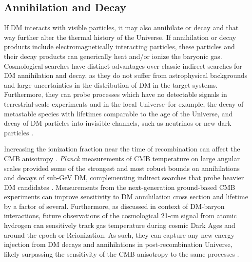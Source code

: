 \documentclass[12pt]{article}
\begin{document}
\subsection{Annihilation and Decay}

If DM interacts with visible particles, it may also annihilate or decay and that way further alter the thermal history of the Universe. 
If annihilation or decay products include electromagnetically interacting particles, these particles and their decay products can generically heat and/or ionize the baryonic gas.
Cosmological searches have distinct advantages over classic indirect searches for DM annihilation and decay, as they do not suffer from astrophysical backgrounds and large uncertainties in the distribution of DM in the target systems.
Furthermore, they can probe processes which have no detectable signals in terrestrial-scale experiments and in the local Universe--for example, the decay of metastable species with lifetimes comparable to the age of the Universe, and decay of DM particles into invisible channels, such as neutrinos or new dark particles \cite{Poulin:2016nat,Poulin:2016anj}. 

Increasing the ionization fraction near the time of recombination can affect the CMB anisotropy \cite{Adams:1998nr,Chen:2003gz, Padmanabhan:2005es,Dvorkin:2013cga}. 
\textit{Planck} measurements of CMB temperature on large angular scales provided some of the strongest and most robust bounds on annihilations and decays of sub-GeV DM, complementing indirect searches that probe heavier DM candidates \cite{Aghanim:2018eyx,Slatyer:2016qyl}. 
Measurements from the next-generation ground-based CMB experiments can improve sensitivity to DM annihilation cross section and lifetime by a factor of several.
Furthermore, as discussed in context of DM-baryon interactions, future observations of the cosmological 21-cm signal from atomic hydrogen can sensitively track gas temperature during cosmic Dark Ages and around the epoch or Reionization.
As such, they can capture any new energy injection from DM decays and annihilations in post-recombination Universe, likely surpassing the sensitivity of the CMB anisotropy to the same processes \cite{Furlanetto:2006wp,Valdes:2007cu,Evoli:2014pva,Lopez-Honorez:2016sur,Poulin:2016anj}. 
\end{document}
